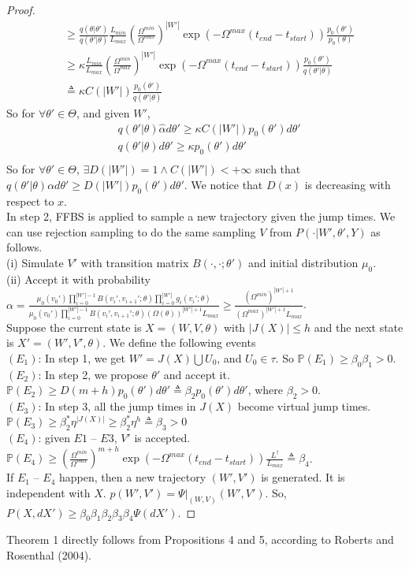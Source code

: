 \begin{proof}
\begin{align*}
&\geq \frac{q(\theta| \theta')}{q(\theta' | \theta)}\frac{L_{min}}{L_{max}}(\frac{\Omega^{min}}{\Omega^{max}})^{|W'|}\exp(-\Omega^{max}(t_{end} - t_{start}))\frac{p_0(\theta')}{p_0(\theta)}\\
&\geq \kappa\frac{L_{min}}{L_{max}}(\frac{\Omega^{min}}{\Omega^{max}})^{|W'|}\exp(-\Omega^{max}(t_{end} - t_{start}))\frac{p_0(\theta')}{q(\theta' | \theta)}\\
&\triangleq \kappa C(|W'|)\frac{p_0(\theta')}{q(\theta' | \theta)}
\end{align*}
So for $\forall \theta' \in \Theta$, and given $W'$,
 \begin{align*}
&q(\theta' | \theta) \hat{\alpha} d\theta' \geq \kappa C(|W'|) p_0(\theta')d\theta'\\
&q(\theta' | \theta)  d\theta' \geq \kappa p_0(\theta')d\theta'\\
\end{align*}
So for $\forall \theta' \in \Theta$,  $\exists D(|W'|) = 1 \wedge C(|W'|) < +\infty$ such that $q(\theta' | \theta)\alpha d\theta' \geq D(|W'|)p_0(\theta')d\theta'$. We notice that $D(x)$ is decreasing with respect to $x$.\\
In step 2, FFBS is applied to sample a new trajectory given the jump times. We can use rejection sampling to do the same sampling $ V$ from $P(\cdot| W', \theta', Y)$ as follows.\\
(i) Simulate $V'$ with transition matrix $B(\cdot,\cdot;\theta')$ and initial distribution $\mu_0$.\\
(ii) Accept it with probability $\alpha= \frac{\mu_0(v_0')\prod_{i = 0}^{|W'| - 1}B(v_i', v_{i + 1}'; \theta)\prod_{i =0}^{|W'|}g_i(v_i'; \theta)}{\mu_0(v_0')\prod_{i = 0}^{|W'| - 1}B(v_i', v_{i + 1}';\theta) (\Omega(\theta))^{|W'| + 1}L_{max}} \geq \frac{(\Omega^{min})^{|W'| + 1}}{(\Omega^{max})^{|W'| + 1}L_{max}}$.\\
Suppose the current state is $X = (W, V, \theta)$ with $|J(X)| \leq h$ and the next state is $X' = (W', V', \theta)$. We define the following events\\
$(E_1)$: In step 1, we get $W' = J(X) \bigcup U_0$, and $U_0 \in \tau$. So $\mathbb{P}(E_1) \geq \beta_0 \beta_1 > 0$.\\
$(E_2)$: In step 2, we propose $\theta'$ and accept it. $\mathbb{P}(E_2) \geq D(m + h)p_0(\theta')d\theta'\triangleq \beta_2 p_0(\theta')d\theta'$, where $\beta_2 > 0$. \\
$(E_3)$: In step 3, all the jump times in $J(X)$ become virtual jump times. $\mathbb{P}(E_3) \geq \beta_2^\ast \eta^{|J(X)|} \geq \beta_2^\ast \eta^h \triangleq \beta_3 > 0$\\
$(E_4)$: given $E1$ -- $E3$, $V'$ is accepted. $\mathbb{P}(E_4) \geq (\frac{\Omega^{min}}{\Omega^{max}})^{m + h}\exp(-\Omega^{max}(t_{end} - t_{start})) \frac{L^\dagger}{L_{max}} \triangleq \beta_4$.\\
If $E_1$ -- $E_4$ happen, then a new trajectory $(W', V')$ is generated. It is independent with $X$. $p(W', V') = \Psi |_{(W,V)}(W', V')$.
So, $P(X, dX') \geq \beta_0\beta_1\beta_2\beta_3\beta_4 \Psi(dX')$.
\end{proof}
Theorem 1 directly follows from Propositions 4 and 5, according to Roberts and Rosenthal (2004).

